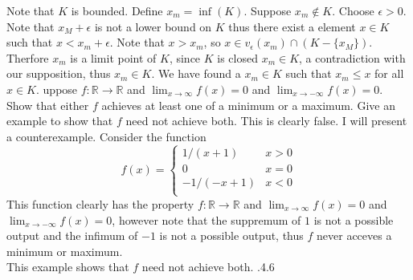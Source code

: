 \documentclass[12pt]{article}
\makeatletter
\theoremstyle{homework}
\newenvironment{exercise}[1]
{\def\@currentlabel{#1}\exercisecore}
{\endexercisecore}
\makeatother
\begin{document}
Note that $K$ is bounded.  Define $x_m=\inf(K)$.  Suppose $x_m\not\in K$.  Choose $\epsilon>0$.  Note that $x_M+\epsilon$ is not a lower bound on $K$ thus there exist a element $x\in K$ such that $x<x_m+\epsilon$.  Note that $x>x_m$, so $x\in v_\epsilon(x_m)\cap (K-\{x_M\})$.  Therfore $x_m$ is a limit point of $K$, since $K$ is closed $x_m\in K$, a contradiction with our supposition, thus $x_m\in K$.  We have found a $x_m\in K$ such that $x_m \leq x$ for all $x \in K$.
\begin{exercise}

Suppose $f : \mathbb{R} \rightarrow \mathbb{R}$ and $\lim_{x\rightarrow \infty} f (x) = 0$ and $\lim_{x\rightarrow -\infty} f (x) = 0$. Show that either $f$ achieves
at least one of a minimum or a maximum. Give an example to show that $f$ need not achieve
both.
\end{exercise}
This is clearly false.  I will present a counterexample.  Consider the function $$f(x)=\begin{cases}
1/(x+1) & x>0\\
0 & x=0\\
-1/(-x+1) & x<0\\
\end{cases}$$
This function clearly has the property $f : \mathbb{R} \rightarrow \mathbb{R}$ and $\lim_{x\rightarrow \infty} f (x) = 0$ and $\lim_{x\rightarrow -\infty} f (x) = 0$, however note that the suppremum of $1$ is not a possible output and the infimum of $-1$ is not a possible output, thus $f$ never acceves a minimum or maximum.\\
This example shows that $f$ need not achieve both.
\begin{exercise}

4.4.6
\end{exercise}
\end{document}
